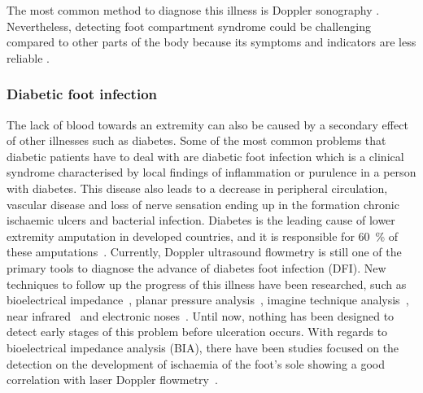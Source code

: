 The most common method to diagnose this illness is Doppler sonography \cite{chhabra2013compartment}. Nevertheless, detecting foot compartment syndrome could be challenging compared to other parts of the body because its symptoms and indicators are less reliable \cite{dodd2013foot}.

\subsubsection{Diabetic foot infection}
\label{section literature 2.3} 
The lack of blood towards an extremity can also be caused by a secondary effect of other illnesses such as diabetes. Some of the most common problems that diabetic patients have to deal with are diabetic foot infection which is a clinical syndrome characterised by local findings of inflammation or purulence in a person with diabetes. This disease also leads to a decrease in peripheral circulation, vascular disease and loss of nerve sensation ending up in the formation chronic ischaemic ulcers and bacterial infection. Diabetes is the leading cause of lower extremity amputation in developed countries, and it is responsible for \SI{60}{\percent} of these amputations~\cite{ucckay2014diabetic}.  Currently, Doppler ultrasound flowmetry is still one of the primary tools to diagnose the advance of diabetes foot infection (DFI). New techniques to follow up the progress of this illness have been researched, such as bioelectrical impedance~\cite{cheng2012application}, planar pressure analysis~\cite{dos2010insole}, imagine technique analysis~\cite{songer2001tissue}, near infrared~\cite{papazoglou2008assessment} and electronic noses~\cite{yusuf2013diagnosis}. Until now, nothing has been designed to detect early stages of this problem before ulceration occurs. With regards to bioelectrical impedance analysis (BIA), there have been studies focused on the detection on the development of ischaemia of the foot's sole showing a good correlation with laser Doppler flowmetry~\cite{cheng2012application}. 

